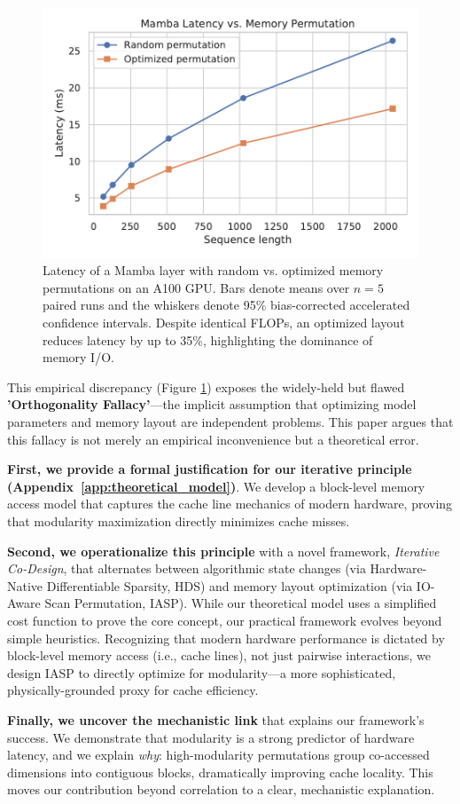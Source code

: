 \documentclass{article}
\begin{document}
\begin{figure}[htbp]
\centering
\includegraphics[width=0.6\linewidth]{figures/mamba_latency_scan_vs_perm.pdf}
\caption{Latency of a Mamba layer with random vs. optimized memory permutations on an A100 GPU. Bars denote means over $n=5$ paired runs and the whiskers denote 95\% bias-corrected accelerated confidence intervals. Despite identical FLOPs, an optimized layout reduces latency by up to 35\%, highlighting the dominance of memory I/O.}
\label{fig:mamba_latency}
\end{figure}

This empirical discrepancy (Figure \ref{fig:mamba_latency}) exposes the widely-held but flawed \textbf{'Orthogonality Fallacy'}—the implicit assumption that optimizing model parameters and memory layout are independent problems. This paper argues that this fallacy is not merely an empirical inconvenience but a theoretical error.

\textbf{First, we provide a formal justification for our iterative principle (Appendix~\ref{app:theoretical_model})}. We develop a block-level memory access model that captures the cache line mechanics of modern hardware, proving that modularity maximization directly minimizes cache misses.

\textbf{Second, we operationalize this principle} with a novel framework, \textit{Iterative Co-Design}, that alternates between algorithmic state changes (via Hardware-Native Differentiable Sparsity, HDS) and memory layout optimization (via IO-Aware Scan Permutation, IASP). While our theoretical model uses a simplified cost function to prove the core concept, our practical framework evolves beyond simple heuristics. Recognizing that modern hardware performance is dictated by block-level memory access (i.e., cache lines), not just pairwise interactions, we design IASP to directly optimize for modularity—a more sophisticated, physically-grounded proxy for cache efficiency.

\textbf{Finally, we uncover the mechanistic link} that explains our framework's success. We demonstrate that modularity is a strong predictor of hardware latency, and we explain \textit{why}: high-modularity permutations group co-accessed dimensions into contiguous blocks, dramatically improving cache locality. This moves our contribution beyond correlation to a clear, mechanistic explanation.
\end{document}
